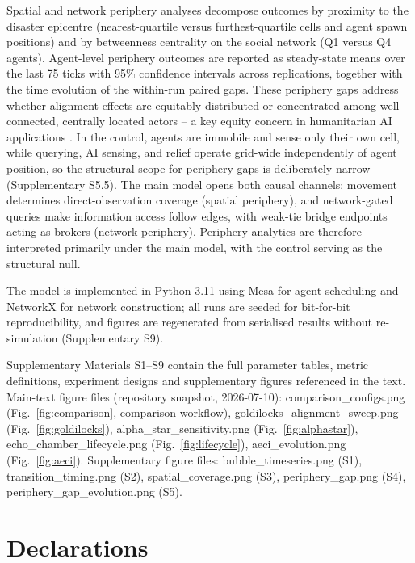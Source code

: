 \documentclass[pdflatex,sn-basic]{sn-jnl}
\begin{document}
Spatial and network periphery analyses decompose outcomes by proximity to the disaster epicentre (nearest-quartile versus furthest-quartile cells and agent spawn positions) and by betweenness centrality on the social network (Q1 versus Q4 agents). Agent-level periphery outcomes are reported as steady-state means over the last 75 ticks with 95\% confidence intervals across replications, together with the time evolution of the within-run paired gaps. These periphery gaps address whether alignment effects are equitably distributed or concentrated among well-connected, centrally located actors -- a key equity concern in humanitarian AI applications \citep{coleman2024weaving}. In the control, agents are immobile and sense only their own cell, while querying, AI sensing, and relief operate grid-wide independently of agent position, so the structural scope for periphery gaps is deliberately narrow (Supplementary S5.5). The main model opens both causal channels: movement determines direct-observation coverage (spatial periphery), and network-gated queries make information access follow edges, with weak-tie bridge endpoints acting as brokers (network periphery). Periphery analytics are therefore interpreted primarily under the main model, with the control serving as the structural null.

The model is implemented in Python 3.11 using Mesa for agent scheduling and NetworkX for network construction; all runs are seeded for bit-for-bit reproducibility, and figures are regenerated from serialised results without re-simulation (Supplementary S9).

\backmatter

Supplementary Materials S1--S9 contain the full parameter tables, metric definitions, experiment designs and supplementary figures referenced in the text. Main-text figure files (repository snapshot, 2026-07-10): comparison\_configs.png (Fig.~\ref{fig:comparison}, comparison workflow), goldilocks\_alignment\_sweep.png (Fig.~\ref{fig:goldilocks}), alpha\_star\_sensitivity.png (Fig.~\ref{fig:alphastar}), echo\_chamber\_lifecycle.png (Fig.~\ref{fig:lifecycle}), aeci\_evolution.png (Fig.~\ref{fig:aeci}). Supplementary figure files: bubble\_timeseries.png (S1), transition\_timing.png (S2), spatial\_coverage.png (S3), periphery\_gap.png (S4), periphery\_gap\_evolution.png (S5).


\section*{Declarations}
\end{document}

